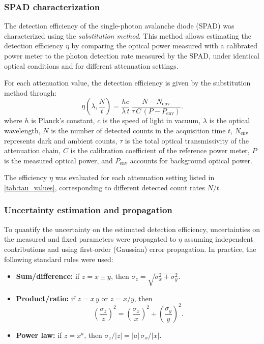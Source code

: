 \subsubsection{SPAD characterization}

The detection efficiency of the single-photon avalanche diode (SPAD)
was characterized using the \emph{substitution method}. This method
allows estimating the detection efficiency $\eta$ by comparing the
optical power measured with a calibrated power meter to the photon
detection rate measured by the SPAD, under identical optical
conditions and for different attenuation settings.

For each attenuation value, the detection efficiency is given by the
substitution method \cite{bienfang2023spd,lopez2020ingaas} through:
\begin{equation}
  \eta\!\left(\lambda, \frac{N}{t}\right)
  =
  \frac{h c}{\lambda\, t}
  \,
  \frac{N - N_{\mathrm{env}}}
  {\tau\, C \, (P - P_{\mathrm{env}})} .
  \label{eq:detection_efficiency}
\end{equation}
where $h$ is Planck’s constant, $c$ is the speed of light in vacuum,
$\lambda$ is the optical wavelength, $N$ is the number of detected
counts in the acquisition time $t$, $N_{\mathrm{env}}$ represents
dark and ambient counts, $\tau$ is the total optical transmissivity
of the attenuation chain, $C$ is the calibration coefficient of the
reference power meter, $P$ is the measured optical power, and
$P_{\mathrm{env}}$ accounts for background optical power.

The efficiency $\eta$ was evaluated for each attenuation setting
listed in \cref{tab:tau_values},
corresponding to different detected count rates $N/t$.

\subsubsection{Uncertainty estimation and propagation}

To quantify the uncertainty on the estimated detection efficiency,
uncertainties on the measured and fixed parameters were propagated to
$\eta$ assuming independent contributions and using first-order
(Gaussian) error propagation.
In practice, the following standard rules were used:
\begin{itemize}
  \item \textbf{Sum/difference:} if $z = x \pm y$, then $\sigma_{z} =
    \sqrt{\sigma_{x}^{2} + \sigma_{y}^{2}}$.
  \item \textbf{Product/ratio:} if $z = x\,y$ or $z = x/y$, then
    \[
      \left(\frac{\sigma_{z}}{z}\right)^{2}
      =
      \left(\frac{\sigma_{x}}{x}\right)^{2}
      +
      \left(\frac{\sigma_{y}}{y}\right)^{2}.
    \]
  \item \textbf{Power law:} if $z = x^{a}$, then $\sigma_{z}/|z| =
    |a|\,\sigma_{x}/|x|$.
\end{itemize}

